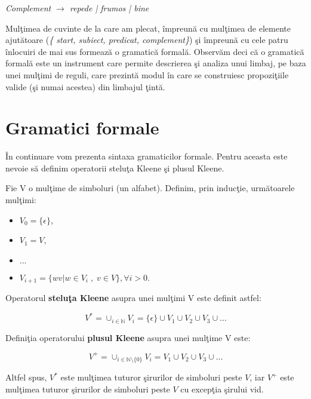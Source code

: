 \textit{ Complement $\rightarrow$ repede | frumos | bine }

Mulţimea de cuvinte de la care am plecat, împreună cu mulţimea de elemente ajutătoare (\textit{\{ start, subiect, predicat, complement\}}) şi împreună cu cele patru înlocuiri de mai sus formează o gramatică formală. Observăm deci că o gramatică formală este un instrument care permite descrierea şi analiza unui limbaj, pe baza unei mulţimi de reguli, care prezintă modul în care se construiesc propoziţiile valide (şi numai acestea) din limbajul ţintă.

\section{Gramatici formale}

În continuare vom prezenta sintaxa gramaticilor formale. Pentru aceasta este nevoie să definim operatorii steluţa Kleene şi plusul Kleene.

Fie V o mulţime de simboluri (un alfabet). Definim, prin inducţie, următoarele mulţimi:
\begin{itemize}
\item
$V_{0} = \{ \epsilon \}$,
\item
$V_{1} = V$,
\item
$\dots$
\item
$V_{i+1} = \{ wv | w \in V_{i} \;, \; v \in V \}, \forall i > 0$.
\end{itemize}

\begin{definitie}
Operatorul \textbf{steluţa Kleene} asupra unei mulţimi V este definit astfel:

\[V^{*} = \mathop{ \cup }_{i \in \mathbb{N}} V_{i} = \{ \epsilon \} \cup V_{1} \cup V_{2} \cup V_{3} \cup \dots \]
\end{definitie}

\begin{definitie}
Definiţia operatorului \textbf{plusul Kleene} asupra unei mulţime V este:

\[V^{+} = \mathop{ \cup }_{i \in \mathbb{N} \setminus \{0\} } V_{i} = V_{1} \cup V_{2} \cup V_{3} \cup \dots \]
\end{definitie}

Altfel spus, $V^{*}$ este mulţimea tuturor şirurilor de simboluri peste $V$, iar $V^{+}$ este mulţimea tuturor şirurilor de simboluri peste $V$ cu excepţia şirului vid.


